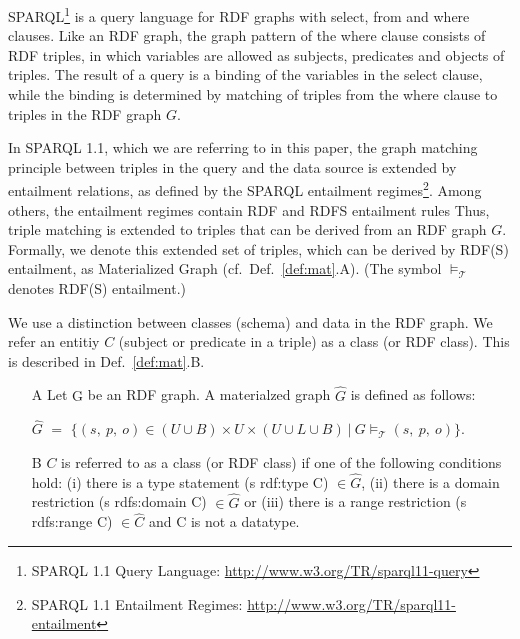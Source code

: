 \documentclass{llncs} %
\begin{document}
SPARQL\footnote{SPARQL 1.1 Query Language: \url{http://www.w3.org/TR/sparql11-query}} 
is a query language for RDF graphs with  \textsf{select}, \textsf{from} and \textsf{where} clauses.
Like an RDF graph, the graph pattern of the \textsf{where} clause consists of RDF triples, in which
variables are allowed as subjects, predicates and objects of triples.
The result of a query is a binding of the variables in the \textsf{select} clause,
while the binding is determined by matching of triples from the \textsf{where} clause
to triples in the RDF graph $G$.

In SPARQL 1.1, which we are referring to in this paper, the graph matching principle between triples in the query and the data source
is extended by entailment relations, as defined by the SPARQL entailment regimes\footnote{SPARQL 1.1 Entailment Regimes:
\url{http://www.w3.org/TR/sparql11-entailment}}. Among others, the entailment regimes contain RDF and RDFS entailment rules
Thus, triple matching is extended to triples that can be derived from an RDF graph $G$. Formally, we denote
this extended set of triples, which can be derived by RDF(S) entailment, as Materialized Graph (cf.~Def.~\ref{def:mat}.A).
(The symbol $\models_{\mathcal{T}}$ denotes RDF(S) entailment.)

We use a distinction between classes (schema) and data in the RDF graph.
We refer an entitiy $C$ (subject or predicate in a triple) as a class (or RDF class).
This is described in Def.~\ref{def:mat}.B.
 

\begin{definition}
\label{def:mat}
\begin{itemize}
	\item[A] Let $\mathrm{G}$ be an RDF graph. A materialzed graph $\hat{G}$ is defined as follows:

$\hat{G}$ $=$ $\{ (s ,\ p , \ o) \in (U\cup B)\times U \times (U\cup L \cup B) \ | \ G \models_{\mathcal{T}} (s, \ p, \ o) \}  $. 

\item[B] $C$ is referred to as a class (or RDF class) if one of the following conditions hold:
(i) there is a type statement  (s rdf:type C) $\in \hat{G}$,
 (ii) there is a domain restriction (s rdfs:domain C) $\in \hat{G}$ or 
(iii) there is a range restriction (s rdfs:range C) $\in \hat{C}$ and C is not a datatype.
\end{itemize}
\end{definition}
\end{document}
